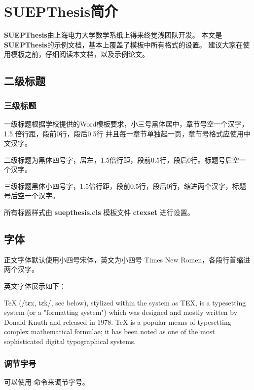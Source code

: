 \chapter{SUEPThesis简介}

\textbf{SUEPThesis}由上海电力大学数学系纸上得来终觉浅团队开发。
本文是\textbf{SUEPThesis}的示例文档，基本上覆盖了模板中所有格式的设置。
建议大家在使用模板之前，仔细阅读本文档，以及示例论文。

\section{二级标题}

\subsection{三级标题}

一级标题根据学校提供的Word模板要求，小三号黑体居中，章节号空一个汉字，1.5 倍行距，段前0行，段后0.5行
并且每一章节单独起一页，章节号格式应使用中文汉字。

二级标题为黑体四号字，居左，1.5倍行距，段前0.5行，段后0行。标题号后空一个汉字。

三级标题黑体小四号字，1.5倍行距，段前0.5行，段后0行，缩进两个汉字，标题号后空一个汉字。

所有标题样式由 \textbf{suepthesis.cls} 模板文件 \textbf{ctexset} 进行设置。

\section{字体}

正文字体默认使用小四号宋体，英文为小四号 Times New Romen，各段行首缩进两个汉字。

英文字体展示如下：

TeX (/tɛx, tɛk/, see below), stylized within the system as TEX, 
is a typesetting system (or a "formatting system") which was designed and mostly written by
Donald Knuth\cite{knuth1984texbook} and released in 1978. 
TeX is a popular means of typesetting complex mathematical formulae; 
it has been noted as one of the most sophisticated digital typographical systems.


\subsection{调节字号}

可以使用 命令来调节字号。

